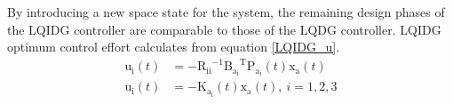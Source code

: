 \documentclass[conference]{IEEEtran}
\begin{document}
By introducing a new space state for the system, the remaining design phases of the LQIDG controller are comparable to those of the LQDG controller. LQIDG optimum control effort calculates from equation \eqref{LQIDG_u}.
\begin{equation}\label{LQIDG_u}
	\begin{split}
		\boldsymbol{\mathrm{u_i}}(t) &= -\boldsymbol{\mathrm{R_{ii}}}^{-1}\boldsymbol{\mathrm{B_{a_i}}}^\mathrm{T}\boldsymbol{\mathrm{P_{a_i}}}(t)\boldsymbol{\mathrm{x_a}}(t) \\
		\boldsymbol{\mathrm{u_i}}(t) &= - \boldsymbol{\mathrm{K_{a_i}}}(t)\boldsymbol{\mathrm{x_a}}(t),~ i = 1, 2, 3
	\end{split}
\end{equation}
\end{document}
